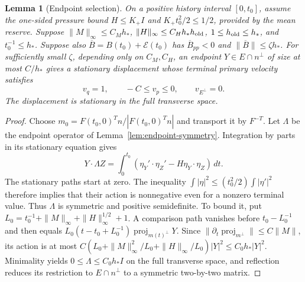 \documentclass[11pt]{article}
\newtheorem{lemma}[theorem]{Lemma}
\theoremstyle{definition}
\begin{document}
\begin{lemma}[Endpoint selection]\label{lem:actual-endpoint}
On a positive history interval $[0,t_0]$, assume the one-sided
pressure bound $H\leq K_+I$ and $K_+t_0^2/2\leq1/2$, provided by
the mean reserve. Suppose $\|M\|_\infty\leq C_Mh_*$,
$\|H\|_\infty\leq C_Hh_*h_{\rm old}$, $1\leq h_{\rm old}\leq h_*$,
and $t_0^{-1}\leq h_*$. Suppose also
$\overline B=B(t_0)+\mathcal E(t_0)$ has
$\overline B_{pp}<0$ and $\|\overline B\|\leq\zeta h_*$.
For sufficiently small $\zeta$, depending only on $C_M,C_H$, an endpoint
$Y\in E\cap n^\perp$ of size at most $C/h_*$ gives a stationary displacement
whose terminal primary velocity satisfies
\[
 v_q=1,\qquad -C\leq v_p\leq0,\qquad v_{E^\perp}=0.
\]
The displacement is stationary in the full transverse space.
\end{lemma}
\begin{proof}
Choose $m_0=F(t_0,0)^Tn/|F(t_0,0)^Tn|$ and transport it by $F^{-T}$.
Let $\Lambda$ be the endpoint operator of Lemma~\ref{lem:endpoint-symmetry}.
Integration by parts in its stationary equation gives
\[
 Y\cdot\Lambda Z=\int_0^{t_0}
    (\eta_Y'\cdot\eta_Z'-H\eta_Y\cdot\eta_Z)\,dt.
\]
The stationary paths start at zero. The inequality
$\int|\eta|^2\leq(t_0^2/2)\int|\eta'|^2$ therefore implies that their
action is nonnegative even for a nonzero terminal value. Thus $\Lambda$
is symmetric and positive semidefinite. To bound it, put
$L_0=t_0^{-1}+\|M\|_\infty+\|H\|_\infty^{1/2}+1$.
A comparison path vanishes before $t_0-L_0^{-1}$ and then equals
$L_0(t-t_0+L_0^{-1})\operatorname{proj}_{m(t)^\perp}Y$.
Since $\|\partial_t\operatorname{proj}_{m^\perp}\|\leq C\|M\|$,
its action is at most
$C(L_0+\|M\|_\infty^2/L_0+\|H\|_\infty/L_0)|Y|^2
\leq C_0h_*|Y|^2$.
Minimality yields $0\leq\Lambda\leq C_0h_*I$ on the full transverse
space, and reflection reduces its restriction to $E\cap n^\perp$ to a
symmetric two-by-two matrix.


\end{proof}
\end{document}
